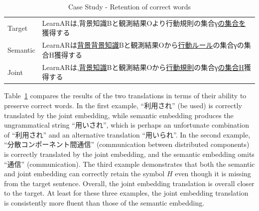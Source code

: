 \begin{table}[h]
    \begin{CJK}{UTF8}{ipxm}
        \begin{tabularx}{\textwidth}{p{1.2cm}b}
            Target & LearnARは,背景知識Bと観測結果Oより行動規則の集合γ\underline{の集合を}獲得する \\
            Semantic & LearnARは\underline{背景背景知識}Bと観測結果Oから\underline{行動ルール}の集合γの集合H獲得する \\
            Joint & LearnARは,\underline{背景知識}Bと観測結果Oから\underline{行動規則}の集合γ\underline{の集合H}獲得する \\\midrule
        \end{tabularx}
    \end{CJK}

    \caption{Case Study - Retention of correct words}
    \label{tab:case_study1}
\end{table}

\begin{CJK}{UTF8}{ipxm}
    Table~\ref{tab:case_study1} compares the results of the two translations in terms of their ability to preserve correct words. In the first example, ``利用され'' (be used) is correctly translated by the joint embedding, while semantic embedding produces the ungrammatical string ``用いされ'', which is perhaps an unfortunate combination of ``利用され'' and an alternative translation ``用いられ''. In the second example, ``分散コンポーネント間通信'' (communication between distributed components) is correctly translated by the joint embedding, and the semantic embedding omits ``通信'' (communication).  The third example demonstrates that both the semantic and joint embedding can correctly retain the symbol $H$ even though it is missing from the target sentence. Overall, the joint embedding translation is overall closer to the target. At least for these three examples, the joint embedding translation is consistently more fluent than those of the semantic embedding.
\end{CJK}

